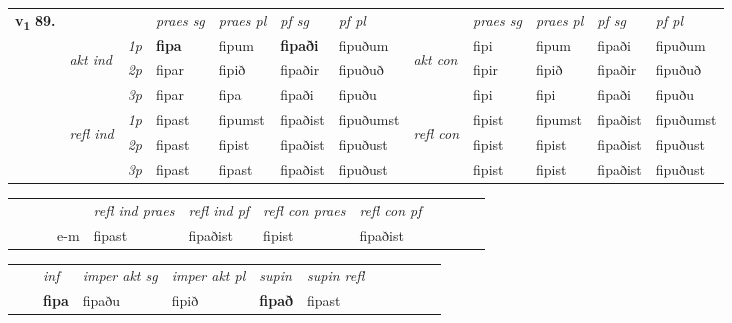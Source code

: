 \begin{tabular}{llllllllllll} \toprule
\multirow{4}{*}{{{\textbf{v{\textsubscript{1}}} \Large{\textbf{89.}}}}}  & &   &  \textit{praes sg}  & \textit{praes pl}  &\textit{ pf sg} & \textit{pf pl} &  &  \textit{praes sg}  & \textit{praes pl}  & \textit{pf sg} & \textit{pf pl } \\*
	\cmidrule{4-7} \cmidrule{9-12}
 & \multirow{3}{*}{\begin{turn}{90}\textit{akt ind}\end{turn}} & {\textit{1p}} & \textbf{fipa} & fipum    & \textbf{fipaði} & fipuðum & \multirow{3}{*}{\begin{turn}{90}\textit{akt con}\end{turn}} &fipi & fipum & fipaði & fipuðum\\*
& &  {\textit{2p}} &  fipar  & fipið   & fipaðir & fipuðuð & & fipir & fipið & fipaðir & fipuðuð \\*
& &  {\textit{3p}} & fipar & fipa   & fipaði & fipuðu & & fipi & fipi& fipaði & fipuðu  \\*
\cmidrule{4-7} \cmidrule{9-12}
 &\multirow{3}{*}{\begin{turn}{90}\textit{refl ind}\end{turn}} & {\textit{1p}} & fipast & fipumst    & fipaðist & fipuðumst & \multirow{3}{*}{\begin{turn}{90}\textit{refl con}\end{turn}}  &fipist & fipumst & fipaðist & fipuðumst\\*
 &&  {\textit{2p}} &  fipast  & fipist   & fipaðist & fipuðust & &fipist & fipist & fipaðist & fipuðust \\*
& &  {\textit{3p}} & fipast & fipast   & fipaðist & fipuðust & & fipist & fipist& fipaðist & fipuðust  \\*
\cmidrule{4-7} \cmidrule{9-12}
\end{tabular}


\begin{tabular}{llllllllllll}
 & &  & &  \textit{refl ind praes} & \textit{refl ind pf} & \textit{refl con praes} & \textit{refl con pf} \\*
&  & & e-m & fipast & fipaðist & fipist & fipaðist \\*
\cmidrule{5-9}
\end{tabular}


\begin{tabular}{llllllllllll}
 & & \textit{inf} & \textit{imper akt sg} & \textit{imper akt pl}    & \textit{supin} & \textit{supin refl}      \\*
  & & \textbf{fipa} & fipaðu  & fipið    &  \textbf{fipað} & fipast  \\*
\cmidrule{1-12}
\end{tabular}



